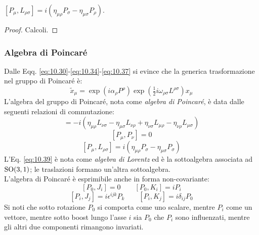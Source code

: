 \begin{proposition}
	$ \left[ P_{\mu},L_{\rho \sigma} \right] = i \left( \eta_{\mu \rho} P_{\sigma} - \eta_{\mu \sigma} P_{\rho} \right) $.
\end{proposition}
\begin{proof}
	Calcoli.
\end{proof}

\subsubsection{Algebra di Poincaré}

Dalle Eqq. \ref{eq:10.30}-\ref{eq:10.34}-\ref{eq:10.37} si evince che la generica trasformazione nel gruppo di Poincaré è:
\begin{equation}
	\tilde{x}_{\mu} = \exp \left( i \alpha_{\rho} P^{\rho} \right) \exp \left( \tfrac{1}{2} i \omega_{\rho \sigma} L^{\rho \sigma} \right) x_{\mu}
	\label{eq:10.38}
\end{equation}
L'algebra del gruppo di Poincaré, nota come \textit{algebra di Poincaré}, è data dalle seguenti relazioni di commutazione:
\begin{equation}
	[L_{\mu \nu},L_{\rho \sigma}] = -i \left( \eta_{\mu \rho} L_{\nu \sigma} - \eta_{\mu \sigma} L_{\nu \rho} + \eta_{\nu \sigma} L_{\mu \rho} - \eta_{\nu \rho} L_{\mu \sigma} \right)
	\label{eq:10.39}
\end{equation}
\begin{equation}
	\left[ P_{\mu},P_{\nu} \right] = 0
	\label{eq:10.40}
\end{equation}
\begin{equation}
	\left[ P_{\mu},L_{\rho \sigma} \right] = i \left( \eta_{\mu \rho} P_{\sigma} - \eta_{\mu \sigma} P_{\sigma} \right)
	\label{eq:10.41}
\end{equation}
L'Eq. \ref{eq:10.39} è nota come \textit{algebra di Lorentz} ed è la sottoalgebra associata ad $ \mathrm{SO}(3,1) $; le traslazioni formano un'altra sottoalgebra.\\
L'algebra di Poincaré è esprimibile anche in forma non-covariante:
\begin{equation*}
	\left[ P_0, J_i \right] = 0 \qquad \left[ P_0, K_i \right] = i P_i
\end{equation*}
\begin{equation*}
	\left[ P_i, J_j \right] = i \epsilon^{ijk} P_k \qquad \left[ P_i, K_j \right] = i \delta_{ij} P_0
\end{equation*}
Si noti che sotto rotazione $ P_0 $ si comporta come uno scalare, mentre $ P_i $ come un vettore, mentre sotto boost lungo l'asse $ i $ sia $ P_0 $ che $ P_i $ sono influenzati, mentre gli altri due componenti rimangono invariati.

